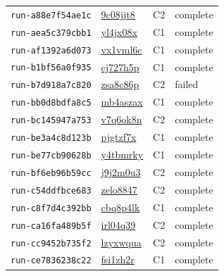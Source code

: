 \begin{longtable}{llll}
\texttt{run-a88e7f54ae1c} & \href{https://forge.coreweave.com/wandb/lbxa-corp/collusion-benchmark/runs/9c08jjt8}{9c08jjt8} & C2 & complete \\
\texttt{run-aea5c379cbb1} & \href{https://forge.coreweave.com/wandb/lbxa-corp/collusion-benchmark/runs/yl4jx08x}{yl4jx08x} & C1 & complete \\
\texttt{run-af1392a6d073} & \href{https://forge.coreweave.com/wandb/lbxa-corp/collusion-benchmark/runs/vx1vml6c}{vx1vml6c} & C1 & complete \\
\texttt{run-b1bf56a0f935} & \href{https://forge.coreweave.com/wandb/lbxa-corp/collusion-benchmark/runs/cj727h5p}{cj727h5p} & C1 & complete \\
\texttt{run-b7d918a7c820} & \href{https://forge.coreweave.com/wandb/lbxa-corp/collusion-benchmark/runs/zsa8c86p}{zsa8c86p} & C2 & failed \\
\texttt{run-bb0d8bdfa8c5} & \href{https://forge.coreweave.com/wandb/lbxa-corp/collusion-benchmark/runs/mb4aszax}{mb4aszax} & C1 & complete \\
\texttt{run-bc145947a753} & \href{https://forge.coreweave.com/wandb/lbxa-corp/collusion-benchmark/runs/v7q6ok8n}{v7q6ok8n} & C2 & complete \\
\texttt{run-be3a4c8d123b} & \href{https://forge.coreweave.com/wandb/lbxa-corp/collusion-benchmark/runs/pjgtzf7x}{pjgtzf7x} & C1 & complete \\
\texttt{run-be77cb90628b} & \href{https://forge.coreweave.com/wandb/lbxa-corp/collusion-benchmark/runs/y4tbmrky}{y4tbmrky} & C1 & complete \\
\texttt{run-bf6eb96b59cc} & \href{https://forge.coreweave.com/wandb/lbxa-corp/collusion-benchmark/runs/j9j2m0u3}{j9j2m0u3} & C2 & complete \\
\texttt{run-c54ddfbce683} & \href{https://forge.coreweave.com/wandb/lbxa-corp/collusion-benchmark/runs/zelo8847}{zelo8847} & C2 & complete \\
\texttt{run-c8f7d4c392bb} & \href{https://forge.coreweave.com/wandb/lbxa-corp/collusion-benchmark/runs/cbq8p4lk}{cbq8p4lk} & C1 & complete \\
\texttt{run-ca16fa489b5f} & \href{https://forge.coreweave.com/wandb/lbxa-corp/collusion-benchmark/runs/irl04q39}{irl04q39} & C2 & complete \\
\texttt{run-cc9452b735f2} & \href{https://forge.coreweave.com/wandb/lbxa-corp/collusion-benchmark/runs/lzyxwqua}{lzyxwqua} & C2 & complete \\
\texttt{run-ce7836238c22} & \href{https://forge.coreweave.com/wandb/lbxa-corp/collusion-benchmark/runs/fsi1zh2r}{fsi1zh2r} & C1 & complete \\

\end{longtable}
